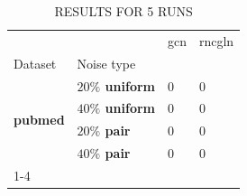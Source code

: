 \begin{table}
\caption{RESULTS FOR 5 RUNS}
\begin{tabular}{llll}
\toprule
 &  & gcn & rncgln \\
Dataset & Noise type &  &  \\
\midrule
\multirow[t]{4}{*}{\textbf{pubmed}} & \textbf{$ 20 \% $ uniform} & 0 & 0 \\
\textbf{} & \textbf{$ 40 \% $ uniform} & 0 & 0 \\
\textbf{} & \textbf{$ 20 \% $ pair} & 0 & 0 \\
\textbf{} & \textbf{$ 40 \% $ pair} & 0 & 0 \\
\cline{1-4}
\bottomrule
\end{tabular}
\end{table}
